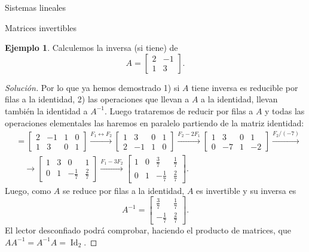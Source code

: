 \documentclass[a4paper,12pt,twoside,spanish,reqno]{amsbook}
\theoremstyle{definition}
\newtheorem{ejemplo}{Ejemplo}[section]
\theoremstyle{remark}
\newcommand{\Id}{\operatorname{Id}}
\begin{document}
\begin{chapter}{Sistemas lineales}
\begin{section}{Matrices invertibles}
			\begin{ejemplo}
				Calculemos la inversa (si tiene) de 
				\begin{equation*}
				A=\begin{bmatrix}2&-1\\1&3 \end{bmatrix}.
				\end{equation*}
			\end{ejemplo}
			\begin{proof}[Solución] Por lo que ya hemos demostrado 1) si $A$ tiene inversa es reducible por filas a la identidad, 2) las operaciones que llevan a $A$ a la identidad, llevan también la identidad  a $A^{-1}$. Luego  trataremos de reducir por filas a $A$ y todas las operaciones elementales las haremos en paralelo partiendo de la matriz identidad:
				\begin{align*}
				[A|\Id] &= \left[\begin{array}{cc|cc}2&-1 &  1&0\\1&3& 0&1\end{array}\right] 
				\stackrel{F_1\leftrightarrow F_2}{\longrightarrow} 
				\left[\begin{array}{cc|cc}1&3& 0&1\\2&-1 &  1&0 \end{array}\right]
				\stackrel{F_2-2 F_1}{\longrightarrow}
				\left[\begin{array}{cc|cc}1&3& 0&1\\0&-7 &  1&-2 \end{array}\right]
				\stackrel{F_2/(-7)}{\longrightarrow}\\
				&\quad\longrightarrow 
				\left[\begin{array}{cc|cc}1&3& 0&1\\0&1 &  -\frac17&\frac27\end{array}\right]
				\stackrel{F_1-3 F_2}{\longrightarrow}
				\left[\begin{array}{cc|cc}1&0&  \frac37&\frac17\\0&1 &  -\frac17&\frac27 \end{array}\right].
				\end{align*}
				Luego, como $A$ se reduce por filas a la identidad, $A$ es invertible y su inversa es  
				\begin{equation*}
				A^{-1}=\begin{bmatrix}\frac37&\frac17\\-\frac17&\frac27 \end{bmatrix}.
				\end{equation*}
				El lector desconfiado  podrá comprobar, haciendo el producto de matrices, que $AA^{-1} = A^{-1}A=\Id_2$.
			\end{proof}
			

\end{section}
\end{chapter}
\end{document}
